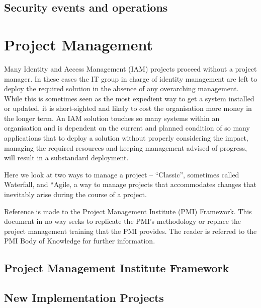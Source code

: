 \hypertarget{security-events-and-operations}{%
\section{Security events and
operations}\label{security-events-and-operations}}

\hypertarget{project-management}{%
\chapter{Project Management}\label{project-management}}

Many Identity and Access Management (IAM) projects proceed without a
project manager. In these cases the IT group in charge of identity
management are left to deploy the required solution in the absence of
any overarching management. While this is sometimes seen as the most
expedient way to get a system installed or updated, it is short-sighted
and likely to cost the organisation more money in the longer term. An
IAM solution touches so many systems within an organisation and is
dependent on the current and planned condition of so many applications
that to deploy a solution without properly considering the impact,
managing the required resources and keeping management advised of
progress, will result in a substandard deployment.

Here we look at two ways to manage a project -- ``Classic'', sometimes
called Waterfall, and ``Agile, a way to manage projects that
accommodates changes that inevitably arise during the course of a
project.

Reference is made to the Project Management Institute (PMI) Framework.
This document in no way seeks to replicate the PMI's methodology or
replace the project management training that the PMI provides. The
reader is referred to the PMI Body of Knowledge for further information.

\hypertarget{project-management-institute-framework}{%
\section{Project Management Institute
Framework}\label{project-management-institute-framework}}

\hypertarget{new-implementation-projects}{%
\section{New Implementation
Projects}\label{new-implementation-projects}}

